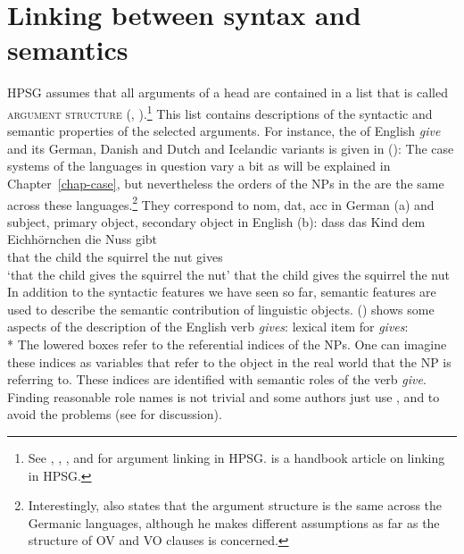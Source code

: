 \section{Linking between syntax and semantics}
\label{sec-linking}


HPSG assumes that all arguments of a head are contained in a list that is called \textsc{argument
  structure} (\argst, \citealp*{DKW2021a}).\footnote{%
See , ,
, and  for argument
linking in HPSG.  is a handbook article on linking in HPSG.
} This list contains descriptions of the syntactic and semantic properties of
the selected arguments. For instance, the \argstl of English \emph{give} and its German, Danish and
Dutch and Icelandic variants is given in ():
\ea
{}
\z
The case systems of the languages in question vary a bit as will be explained in
Chapter~\ref{chap-case}, but nevertheless the orders of the NPs in the \argstl are the same across these
languages.\footnote{%
  Interestingly, \citet[]{Haider2010a} also states that the argument structure is the same
  across the Germanic languages, although he makes different assumptions as far as the structure of
  OV and VO clauses is concerned.%
} They correspond to nom, dat, acc in German (a) and subject, primary object, secondary object
in English (b):
\eal
\ex 
\gll dass das Kind dem Eichhörnchen die Nuss gibt\\
    that the child  the squirrel    the nut gives\\
\glt `that the child gives the squirrel the nut'
\ex that the child gives the squirrel the nut
\zl
In addition to the syntactic features we have seen so far, semantic features are used to describe the
semantic contribution of linguistic objects. () shows some aspects of the description of the English verb
\emph{gives}:
\ea
lexical item for \emph{gives}:\\*
\z
The lowered boxes refer to the referential indices of the NPs. One can imagine these indices as
variables that refer to the object in the real world that the NP is referring to. These indices are
identified with semantic roles of the verb \emph{give}. Finding reasonable role names is not trivial
and some authors just use \argone, \argtwo and \argthree to avoid the problems (see \citealp{Dowty91a}
for discussion).

